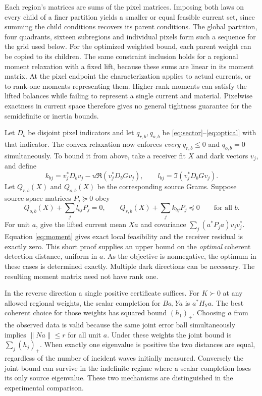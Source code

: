 \documentclass[anonymous,12pt]{iopjournal}
\theoremstyle{remark}\newtheorem{remark}[theorem]{Remark}
\numberwithin{equation}{section}
\begin{document}
Each region's matrices are sums of the pixel matrices. Imposing both laws on every child of a finer partition yields a smaller or equal feasible current set, since summing the child conditions recovers its parent conditions. The global partition, four quadrants, sixteen subregions and individual pixels form such a sequence for the grid used below. For the optimized weighted bound, each parent weight can be copied to its children. The same constraint inclusion holds for a regional moment relaxation with a fixed lift, because these sums are linear in its moment matrix. At the pixel endpoint the characterization applies to actual currents, or to rank-one moments representing them. Higher-rank moments can satisfy the lifted balances while failing to represent a single current and material. Pixelwise exactness in current space therefore gives no general tightness guarantee for the semidefinite or inertia bounds.

Let $D_b$ be disjoint pixel indicators and let $q_{r,b},q_{o,b}$ be \eqref{eq:sector}--\eqref{eq:optical} with that indicator. The convex relaxation now enforces \emph{every} $q_{r,b}\le0$ and $q_{o,b}=0$ simultaneously. To bound it from above, take a receiver fit $X$ and dark vectors $v_j$, and define
\begin{equation}
 k_{bj}=v_j^*D_bv_j-u\Re(v_j^*D_bGv_j),\qquad
 l_{bj}=\Im(v_j^*D_bGv_j).\label{eq:localw}
\end{equation}
Let $Q_{r,b}(X)$ and $Q_{o,b}(X)$ be the corresponding source Grams. Suppose source-space matrices $P_j\succeq0$ obey
\begin{equation}
 Q_{o,b}(X)+\sum_j l_{bj}P_j=0,\qquad
 Q_{r,b}(X)+\sum_j k_{bj}P_j\preceq0\qquad\text{for all }b.\label{eq:moment}
\end{equation}
For unit $a$, give the lifted current mean $Xa$ and covariance $\sum_j(a^*P_j a)v_jv_j^*$. Equation \eqref{eq:moment} gives exact local feasibility and the receiver residual is exactly zero. This short proof supplies an upper bound on the \emph{optimal} coherent detection distance, uniform in $a$. As the objective is nonnegative, the optimum in these cases is determined exactly. Multiple dark directions can be necessary. The resulting moment matrix need not have rank one.

In the reverse direction a single positive certificate suffices. For $K\succ0$ at any allowed regional weights, the scalar completion for $Ba,Ya$ is $a^*H_Ya$. The best coherent choice for those weights has squared bound $(h_1)_+$. Choosing $a$ from the observed data is valid because the same joint error ball simultaneously implies $\|Na\|\le r$ for all unit $a$. Under these weights the joint bound is $\sum_j(h_j)_+$. When exactly one eigenvalue is positive the two distances are equal, regardless of the number of incident waves initially measured. Conversely the joint bound can survive in the indefinite regime where a scalar completion loses its only source eigenvalue. These two mechanisms are distinguished in the experimental comparison.
\end{document}
